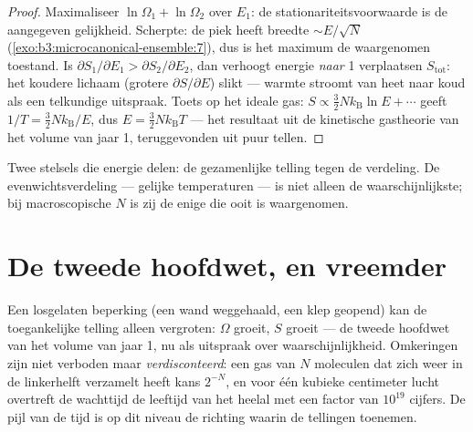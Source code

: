 \begin{proof}
Maximaliseer $\ln\Omega_1 + \ln\Omega_2$ over $E_1$: de
stationariteitsvoorwaarde is de aangegeven gelijkheid. Scherpte: de piek
heeft breedte $\sim E/\sqrt N$ (\cref{exo:b3:microcanonical-ensemble:7}),
dus is het maximum de waargenomen toestand. Is $\partial S_1/\partial E_1 >
\partial S_2/\partial E_2$, dan verhoogt energie \emph{naar} 1
verplaatsen $S_{\text{tot}}$: het koudere lichaam (grotere $\partial S/\partial E$) slikt --- warmte stroomt van heet naar koud als een
telkundige uitspraak. Toets op het ideale gas: $S \propto \tfrac32 Nk_{\text{B}}\ln E + \cdots$ geeft $1/T = \tfrac32 Nk_{\text{B}}/E$, dus
$E = \tfrac32
Nk_{\text{B}}T$ --- het resultaat uit de kinetische
gastheorie van het volume van jaar 1, teruggevonden uit puur tellen.
\end{proof}

\begin{omfigure}

{\small Twee stelsels die energie delen: de gezamenlijke telling tegen de
verdeling. De evenwichtsverdeling --- gelijke temperaturen --- is niet
alleen de waarschijnlijkste; bij macroscopische $N$ is zij de enige die
ooit is waargenomen.}
\end{omfigure}

\section{De tweede hoofdwet, en vreemder}

\begin{proposition}\label{prop:b3:microcanonical-ensemble:second-law}
Een losgelaten beperking (een wand weggehaald, een klep geopend) kan de
toegankelijke telling alleen vergroten: $\Omega$ groeit, $S$ groeit --- de
tweede hoofdwet van het volume van jaar 1, nu als uitspraak over
waarschijnlijkheid. Omkeringen zijn niet verboden maar
\emph{verdisconteerd}: een gas van $N$ moleculen dat zich weer in de
linkerhelft verzamelt heeft kans $2^{-N}$, en voor één kubieke centimeter
lucht overtreft de wachttijd de leeftijd van het heelal met een factor van
$10^{19}$ cijfers. De pijl van de tijd is op dit niveau de richting waarin
de tellingen toenemen.
\end{proposition}

